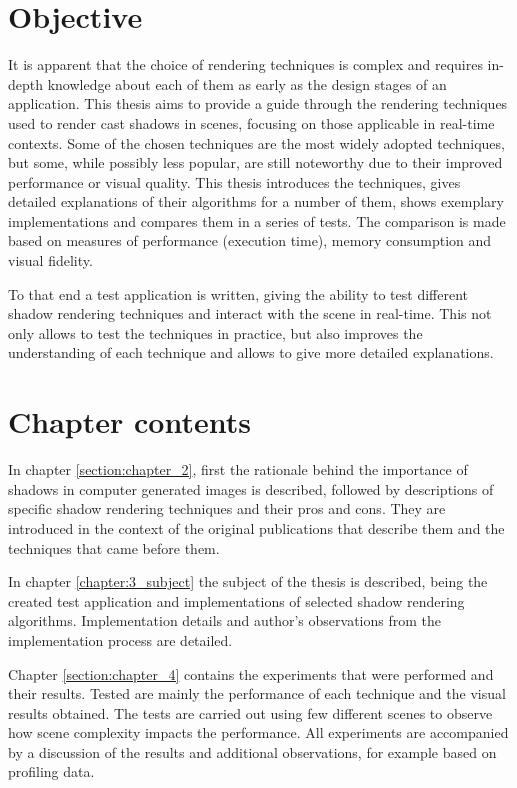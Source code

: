 \section{Objective}

It is apparent that the choice of rendering techniques is complex and requires in-depth knowledge about each of them as early as the design stages of an application. This thesis aims to provide a guide through the rendering techniques used to render cast shadows in scenes, focusing on those applicable in real-time contexts. Some of the chosen techniques are the most widely adopted techniques, but some, while possibly less popular, are  still noteworthy due to their improved performance or visual quality. This thesis introduces the techniques, gives detailed explanations of their algorithms for a number of them, shows exemplary implementations and compares them in a series of tests. The comparison is made based on measures of performance (execution time), memory consumption and visual fidelity.

To that end a test application is written, giving the ability to test different shadow rendering techniques and interact with the scene in real-time. This not only allows to test the techniques in practice, but also improves the understanding of each technique and allows to give more detailed explanations.

\section{Chapter contents}
In chapter \ref{section:chapter_2}, first the rationale behind the importance of shadows in computer generated images is described, followed by descriptions of specific shadow rendering techniques and their pros and cons. They are introduced in the context of the original publications that describe them and the techniques that came before them.

In chapter \ref{chapter:3_subject} the subject of the thesis is described, being the created test application and implementations of selected shadow rendering algorithms. Implementation details and author's observations from the implementation process are detailed.

Chapter \ref{section:chapter_4} contains the experiments that were performed and their results. Tested are mainly the performance of each technique and the visual results obtained. The tests are carried out using few different scenes to observe how scene complexity impacts the performance. All experiments are accompanied by a discussion of the results and additional observations, for example based on profiling data.

